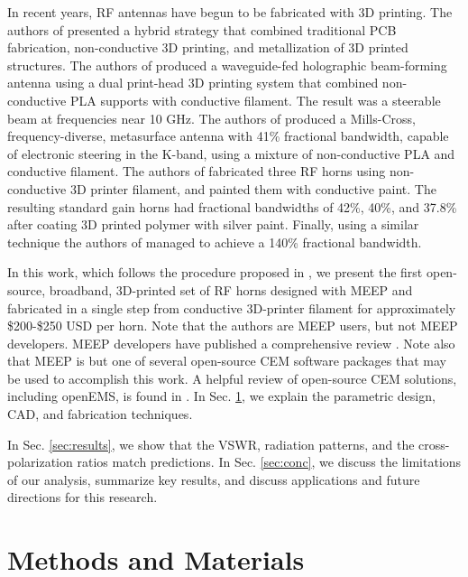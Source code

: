 \documentclass[electronics,article,submit,pdftex,moreauthors]{Definitions/mdpi}
\begin{document}
In recent years, RF antennas have begun to be fabricated with 3D printing.  The authors of \cite{alkaraki2020mmwave-bcd} presented a hybrid strategy that combined traditional PCB fabrication, non-conductive 3D printing, and metallization of 3D printed structures.  The authors of \cite{yoo2022hollow-9a5} produced a waveguide-fed holographic beam-forming antenna using a dual print-head 3D printing system that combined non-conductive PLA supports with conductive filament.  The result was a steerable beam at frequencies near 10 GHz.  The authors of \cite{yurduseven2017computational-82f} produced a Mills-Cross, frequency-diverse, metasurface antenna with 41\% fractional bandwidth, capable of electronic steering in the K-band, using a mixture of non-conductive PLA and conductive filament.  The authors of \cite{alkaraki2025lowcost-d32} fabricated three RF horns using non-conductive 3D printer filament, and painted them with conductive paint.  The resulting standard gain horns had fractional bandwidths of 42\%, 40\%, and 37.8\% after coating 3D printed polymer with silver paint.  Finally, using a similar technique the authors of \cite{betancourt2017additive-b05} managed to achieve a 140\% fractional bandwidth.

In this work, which follows the procedure proposed in \cite{Hanson2022MeepCon}, we present the first open-source, broadband, 3D-printed set of RF horns designed with MEEP and fabricated in a single step from conductive 3D-printer filament for approximately \$200-\$250 USD per horn.  Note that the authors are MEEP users, but not MEEP developers.  MEEP developers have published a comprehensive review \cite{10.1016/j.cpc.2009.11.008}.  Note also that MEEP is but one of several open-source CEM software packages that may be used to accomplish this work.  A helpful review of open-source CEM solutions, including openEMS, is found in \cite{fedeli2019open-source-8bb}. In Sec. \ref{sec:mat_meth}, we explain the parametric design, CAD, and fabrication techniques.

In Sec. \ref{sec:results}, we show that the VSWR, radiation patterns, and the cross-polarization ratios match predictions.  In Sec. \ref{sec:conc}, we discuss the limitations of our analysis, summarize key results, and discuss applications and future directions for this research.

\section{Methods and Materials}
\label{sec:mat_meth}
\end{document}
